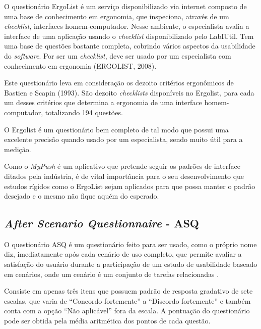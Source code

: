       O questionário ErgoList é um serviço disponibilizado via internet composto de uma base de conhecimento em ergonomia,
      que inspeciona, através de um \textit{checklist}, interfaces homem-computador. Nesse ambiente, o especialista avalia a interface 
      de uma aplicação usando o \textit{checklist} disponibilizado pelo LabIUtil. Tem uma base de questões bastante completa, cobrindo
      vários aspectos da usabilidade do \textit{software}. Por ser um \textit{checklist}, deve ser usado por um especialista com conhecimento em
      ergonomia (ERGOLIST, 2008).
      
      Este questionário leva em consideração os dezoito critérios ergonômicos de Bastien e Scapin (1993). São dezoito \textit{checklists}
      disponíveis no Ergolist, para cada um desses critérios que determina a ergonomia de uma interface homem-computador,
      totalizando 194 questões.
      
      O Ergolist é um questionário bem completo de tal modo que possui uma excelente precisão quando usado por um especialista,
      sendo muito útil para a medição.	

      Como o \textit{MyPush} é um aplicativo que pretende seguir os padrões de interface ditados pela indústria, é de vital
      importância para o seu desenvolvimento que estudos rígidos como o ErgoList sejam aplicados para que possa manter o 
      padrão desejado e o mesmo não fique aquém do esperado.
    
    \subsection{\textit{After Scenario Questionnaire} - ASQ}
    
      O questionário ASQ é um questionário feito para ser usado, como o próprio nome diz, imediatamente após cada cenário de uso
      completo, que permite avaliar a satisfação do usuário durante a participação de um estudo de usabilidade baseado em cenários,
      onde um cenário é um conjunto de tarefas relacionadas \cite{lewis91}.
      
      Consiste em apenas três itens que possuem padrão de resposta gradativo de sete escalas, que varia de “Concordo fortemente” 
      a “Discordo fortemente” e também conta com a opção “Não aplicável” fora da escala. A pontuação do questionário pode ser
      obtida pela média aritmética dos pontos de cada questão.
      

